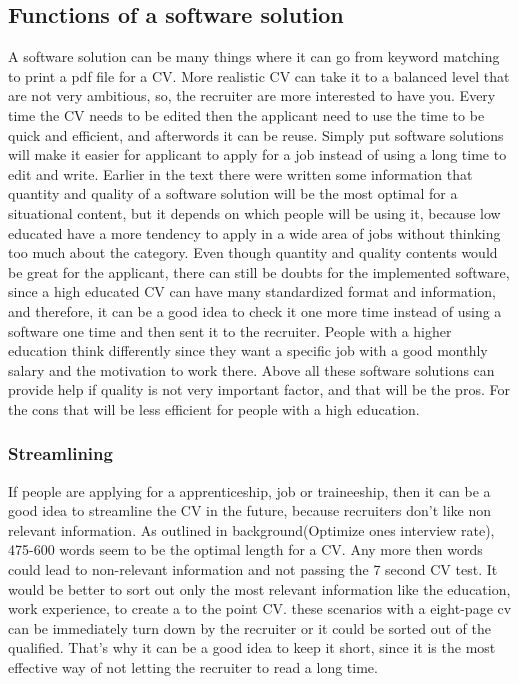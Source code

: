 \subsection{Functions of a software solution}
A software solution can be many things where it can go from keyword matching to print a pdf file for a CV.
More realistic CV can take it to a balanced level that are not very ambitious, 
so, the recruiter are more interested to have you. Every time the CV needs to be edited
then the applicant need to use the time to be quick and efficient, and afterwords it can be reuse.
Simply put software solutions will make it easier for applicant to apply for a job instead of using a long time to edit and write. 
Earlier in the text there were written some information 
that quantity and quality of a software solution will be the most optimal for a situational content,
but it depends on which people will be using it, because low educated have a more tendency to apply
in a wide area of jobs without thinking too much about the category. 
Even though quantity and quality contents would be great for the applicant, 
there can still be doubts for the implemented software, since a high educated CV can have many standardized format and information,
and therefore, it can be a good idea to check it one more time instead of using a software one time and then sent it to the recruiter.
People with a higher education think differently since they want a specific job
with a good monthly salary and the motivation to work there. 
Above all these software solutions can provide help if quality is not very important factor,
and that will be the pros. For the cons that will be less efficient for people with a high education.

\subsubsection{Streamlining}
If people are applying for a apprenticeship, job or traineeship, 
then it can be a good idea to streamline the CV in the future, because recruiters don't like non relevant information.
As outlined in background(Optimize ones interview rate), 475-600 words seem to be the optimal length for a CV.
Any more then words could lead to non-relevant information and not passing the 7 second CV test.
It would be better to sort out only the most relevant information 
like the education, work experience, to create a to the point CV. 
these scenarios with a eight-page cv can be immediately turn down by the recruiter or 
it could be sorted out of the qualified.
That's why it can be a good idea to keep it short, 
since it is the most effective way of not letting the recruiter to read a long time.

